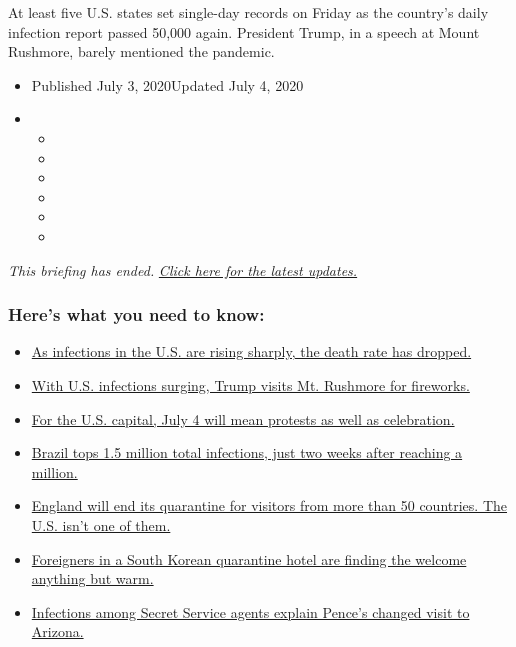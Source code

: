 At least five U.S. states set single-day records on Friday as the
country's daily infection report passed 50,000 again. President Trump,
in a speech at Mount Rushmore, barely mentioned the pandemic.

\begin{itemize}
\item
  Published July 3, 2020Updated July 4, 2020
\item
  \begin{itemize}
  \item
  \item
  \item
  \item
  \item
  \item
  \end{itemize}
\end{itemize}

\emph{This briefing has ended.}
\href{https://www.nytimes3xbfgragh.onion/2020/07/04/world/coronavirus-updates.html}{\emph{Click
here for the latest updates.}}

\hypertarget{heres-what-you-need-to-know}{%
\subsubsection{Here's what you need to
know:}\label{heres-what-you-need-to-know}}

\begin{itemize}
\tightlist
\item
  \protect\hyperlink{link-7c348203}{As infections in the U.S. are rising
  sharply, the death rate has dropped.}
\item
  \protect\hyperlink{link-26a02377}{With U.S. infections surging, Trump
  visits Mt. Rushmore for fireworks.}
\item
  \protect\hyperlink{link-689e6513}{For the U.S. capital, July 4 will
  mean protests as well as celebration.}
\item
  \protect\hyperlink{link-f303931}{Brazil tops 1.5 million total
  infections, just two weeks after reaching a million.}
\item
  \protect\hyperlink{link-63eb27ea}{England will end its quarantine for
  visitors from more than 50 countries. The U.S. isn't one of them.}
\item
  \protect\hyperlink{link-364871b}{Foreigners in a South Korean
  quarantine hotel are finding the welcome anything but warm.}
\item
  \protect\hyperlink{link-778258a1}{Infections among Secret Service
  agents explain Pence's changed visit to Arizona.}
\end{itemize}

